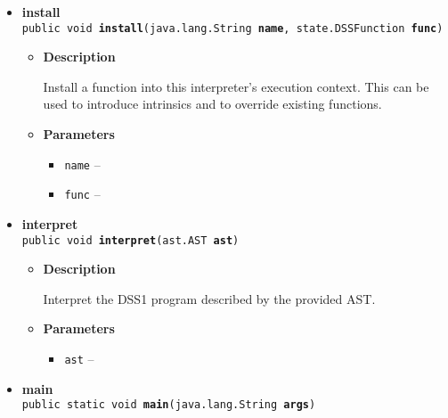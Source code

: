 {{{{\begin{itemize}
{\begin{itemize}
{Install the provided library of functions into this interpreter's execution context. This allows users of the interpreter to pre-define or override certain functions, as appropriate to usage. Functions are delivered in a map, where keys give the name of the function, and the value gives the DSSFunction object itself.
}
\item{
{\bf  Parameters}
  \begin{itemize}
   \item{
\texttt{library} -- map of names to functions}
  \end{itemize}
}%
\end{itemize}
}%
\item{ 
\hypertarget{org.openmrs.module.dssmodule.DSSInterpreter.install(java.lang.String, org.openmrs.module.dssmodule.state.DSSFunction)}{{\bf  install}\\}
\texttt{public void\ {\bf  install}(\texttt{java.lang.String} {\bf  name},
\texttt{state.DSSFunction} {\bf  func})
\label{org.openmrs.module.dssmodule.DSSInterpreter.install(java.lang.String, org.openmrs.module.dssmodule.state.DSSFunction)}}%
\begin{itemize}
\item{
{\bf  Description}

Install a function into this interpreter's execution context. This can be used to introduce intrinsics and to override existing functions.
}
\item{
{\bf  Parameters}
  \begin{itemize}
   \item{
\texttt{name} -- }
   \item{
\texttt{func} -- }
  \end{itemize}
}%
\end{itemize}
}%
\item{ 
\hypertarget{org.openmrs.module.dssmodule.DSSInterpreter.interpret(org.openmrs.module.dssmodule.ast.AST)}{{\bf  interpret}\\}
\texttt{public void\ {\bf  interpret}(\texttt{ast.AST} {\bf  ast})
\label{org.openmrs.module.dssmodule.DSSInterpreter.interpret(org.openmrs.module.dssmodule.ast.AST)}}%
\begin{itemize}
\item{
{\bf  Description}

Interpret the DSS1 program described by the provided AST.
}
\item{
{\bf  Parameters}
  \begin{itemize}
   \item{
\texttt{ast} -- }
  \end{itemize}
}%
\end{itemize}
}%
\item{ 
\hypertarget{org.openmrs.module.dssmodule.DSSInterpreter.main(java.lang.String[])}{{\bf  main}\\}
\texttt{public static void\ {\bf  main}(\texttt{java.lang.String\lbrack \rbrack } {\bf  args})
\label{org.openmrs.module.dssmodule.DSSInterpreter.main(java.lang.String[])}}%
}%
\end{itemize}
}
}
}}
